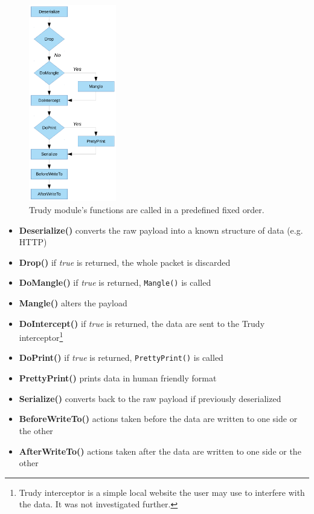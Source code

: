 \documentclass[thesis=M,english]{FITthesis}[2012/10/20]
\begin{document}
\begin{figure}
	\centering
	\includegraphics[width=0.34\textwidth]{trudy-flow.pdf}
	\caption[Trudy's data flow]{Trudy module's functions are called in a predefined fixed order.}
	\label{img:analysis-trudy-flow}
\end{figure}

\begin{itemize}
	\item \textbf{Deserialize()} converts the raw payload into a known structure of data (e.g. HTTP)
	\item \textbf{Drop()} if \emph{true} is returned, the whole packet is discarded
	\item \textbf{DoMangle()} if \emph{true} is returned, \texttt{Mangle()} is called
	\item \textbf{Mangle()} alters the payload
	\item \textbf{DoIntercept()} if \emph{true} is returned, the data are sent to the Trudy interceptor\footnote{Trudy interceptor is a simple local website the user may use to interfere with the data. It was not investigated further.}
	\item \textbf{DoPrint()} if \emph{true} is returned, \texttt{PrettyPrint()} is called
	\item \textbf{PrettyPrint()} prints data in human friendly format
	\item \textbf{Serialize()} converts back to the raw payload if previously deserialized
	\item \textbf{BeforeWriteTo()} actions taken before the data are written to one side or the other
	\item \textbf{AfterWriteTo()} actions taken after the data are written to one side or the other

\end{itemize}
\end{document}
